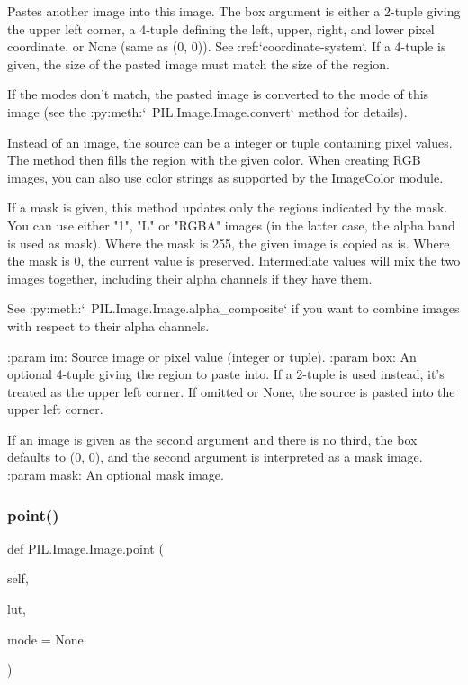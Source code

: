\begin{DoxyVerb}Pastes another image into this image. The box argument is either
a 2-tuple giving the upper left corner, a 4-tuple defining the
left, upper, right, and lower pixel coordinate, or None (same as
(0, 0)). See :ref:`coordinate-system`. If a 4-tuple is given, the size
of the pasted image must match the size of the region.

If the modes don't match, the pasted image is converted to the mode of
this image (see the :py:meth:`~PIL.Image.Image.convert` method for
details).

Instead of an image, the source can be a integer or tuple
containing pixel values.  The method then fills the region
with the given color.  When creating RGB images, you can
also use color strings as supported by the ImageColor module.

If a mask is given, this method updates only the regions
indicated by the mask.  You can use either "1", "L" or "RGBA"
images (in the latter case, the alpha band is used as mask).
Where the mask is 255, the given image is copied as is.  Where
the mask is 0, the current value is preserved.  Intermediate
values will mix the two images together, including their alpha
channels if they have them.

See :py:meth:`~PIL.Image.Image.alpha_composite` if you want to
combine images with respect to their alpha channels.

:param im: Source image or pixel value (integer or tuple).
:param box: An optional 4-tuple giving the region to paste into.
   If a 2-tuple is used instead, it's treated as the upper left
   corner.  If omitted or None, the source is pasted into the
   upper left corner.

   If an image is given as the second argument and there is no
   third, the box defaults to (0, 0), and the second argument
   is interpreted as a mask image.
:param mask: An optional mask image.
\end{DoxyVerb}
 \mbox{\label{classPIL_1_1Image_1_1Image_a4391dc1ad91dff0a36f00fffd05bdee6}} 
\subsubsection{\texorpdfstring{point()}{point()}}
{\footnotesize\ttfamily def P\+I\+L.\+Image.\+Image.\+point (\begin{DoxyParamCaption}\item[{}]{self,  }\item[{}]{lut,  }\item[{}]{mode = {\ttfamily None} }\end{DoxyParamCaption})}

